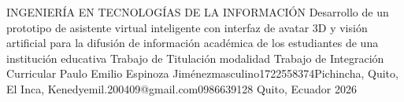 \documentclass[12pt,a4paper,oneside]{report}
\begin{document}
{INGENIERÍA EN TECNOLOGÍAS DE LA INFORMACIÓN} %
{Desarrollo de un prototipo de asistente virtual inteligente con interfaz de avatar 3D y visión artificial para la difusión de información académica de los estudiantes de una institución educativa} %
{Trabajo de Titulación modalidad Trabajo de Integración Curricular} %
{\UTIDatosAutores
  {Paulo Emilio Espinoza Jiménez}{masculino}{1722558374}{Pichincha, Quito, El Inca, Kenedy}{emil.200409@gmail.com}{0986639128}} %
{} %
{Quito, Ecuador} %
{2026} %

\UTIFrontMatter


















\UTIMainMatter
\end{document}
